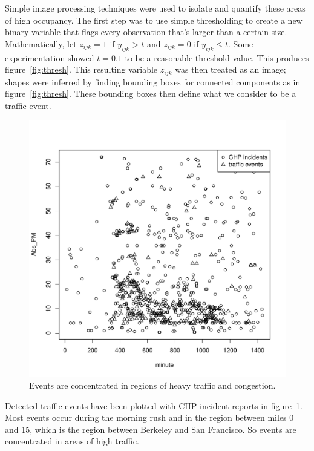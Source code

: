 \documentclass[12pt]{article}
\begin{document}
Simple image processing techniques were used to isolate and quantify these areas of
high occupancy. The first step was to use simple thresholding to create a
new binary variable that flags every observation that's larger than a
certain size.
Mathematically, let $z_{ijk} = 1$ if $y_{ijk} > t$ and $z_{ijk} = 0$ if $y_{ijk}
\leq t$. Some experimentation showed $t = 0.1$ to be a reasonable threshold
value. This produces figure~\ref{fig:thresh}. This resulting variable
$z_{ijk}$ was
then treated as an image; shapes were inferred by finding bounding boxes
for connected components as in figure~\ref{fig:thresh}. These bounding
boxes then define what we consider to be a traffic event. 

\begin{figure}
    \label{fig:pointplot}
    \centering
    \includegraphics[scale=0.5]{../pointplot.pdf}
    \caption{Events are concentrated in regions of heavy traffic and
    congestion.}
\end{figure}

Detected traffic events have been plotted with CHP incident reports in
figure~\ref{fig:pointplot}.  Most events occur during the morning rush and
in the region between miles 0 and 15, which is the region between Berkeley
and San Francisco. So events are concentrated in areas of high traffic.
\end{document}

